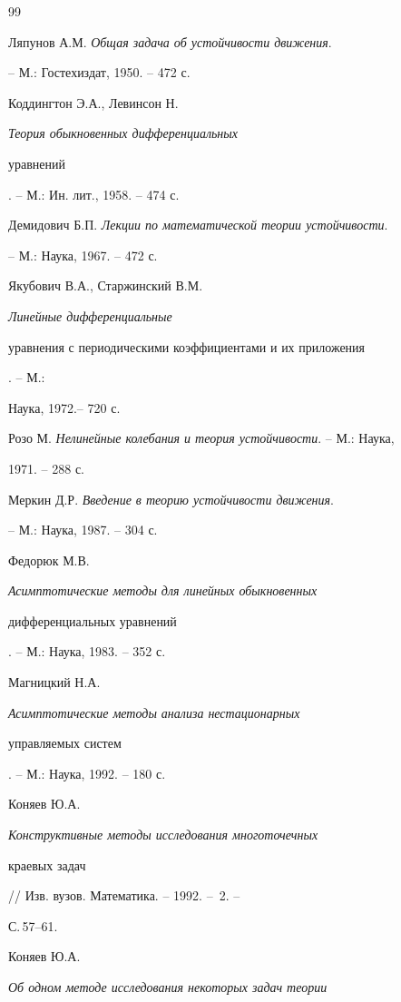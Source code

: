 \begin{thebibliography}{99} 




Ляпунов А.М. {\em Общая задача об устойчивости движения}. 


-- М.: Гостехиздат, 1950. -- 472 с.  




Коддингтон Э.А., Левинсон Н. {\em Теория обыкновенных дифференциальных 


уравнений}. -- М.: Ин. лит., 1958. -- 474 с. 




Демидович Б.П. {\em Лекции по математической теории устойчивости}. 


-- М.: Наука, 1967. -- 472 с.  




Якубович В.А., Старжинский В.М. {\em Линейные дифференциальные 


уравнения с периодическими коэффициентами и их приложения}. -- М.:


Наука, 1972.-- 720 с. 




Розо М. {\em Нелинейные колебания и теория устойчивости}. -- М.: Наука, 


1971. -- 288 с.  




Меркин Д.Р. {\em Введение в теорию устойчивости движения}. 


-- М.: Наука, 1987. -- 304 с. 




Федорюк М.В. {\em Асимптотические методы для линейных обыкновенных 


дифференциальных уравнений}. -- М.: Наука, 1983. -- 352 с. 




Магницкий Н.А. {\em Асимптотические методы анализа нестационарных 


управляемых систем}. -- М.: Наука, 1992. -- 180 с. 




Коняев Ю.А. {\em Конструктивные методы исследования многоточечных 


краевых задач} // Изв. вузов. Математика. -- 1992. -- \No\,2. -- 


С.\,57--61. 




Коняев Ю.А. {\em Об одном методе исследования некоторых задач теории  


}
\end{thebibliography}
